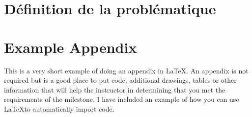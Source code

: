 \documentclass[12pt]{article}
\begin{document}
\section{Définition de la problématique}








\newpage
\appendix
\section{Example Appendix}
This is a very short example of doing an appendix in \LaTeX.  An appendix is not required but is a good place to put code, additional drawings, tables or other information that will help the instructor in determining that you met the requirements of the milestone.  I have included an example of how you can use \LaTeX to automatically import code.



\end{document}
